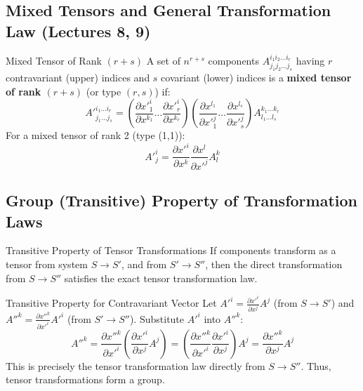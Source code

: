 \documentclass[11pt,a4paper]{article}
\begin{document}
\subsection{Mixed Tensors and General Transformation Law (Lectures 8, 9)}
\begin{definitionbox}{Mixed Tensor of Rank $(r+s)$}
A set of $n^{r+s}$ components $A^{i_1 i_2 \dots i_r}_{j_1 j_2 \dots j_s}$ having $r$ contravariant (upper) indices and $s$ covariant (lower) indices is a \textbf{mixed tensor of rank $(r+s)$} (or type $(r,s)$) if:
\[
A'^{i_1 \dots i_r}_{j_1 \dots j_s} = \left( \frac{\partial x'^i_1}{\partial x^{k_1}} \dots \frac{\partial x'^i_r}{\partial x^{k_r}} \right) \left( \frac{\partial x^{l_1}}{\partial x'^j_1} \dots \frac{\partial x^{l_s}}{\partial x'^j_s} \right) A^{k_1 \dots k_r}_{l_1 \dots l_s}
\]
For a mixed tensor of rank 2 (type (1,1)):
\[
A'^i_j = \frac{\partial x'^i}{\partial x^k} \frac{\partial x^l}{\partial x'^j} A^k_l
\]
\end{definitionbox}

\subsection{Group (Transitive) Property of Transformation Laws}
\begin{theorembox}{Transitive Property of Tensor Transformations}
If components transform as a tensor from system $S \to S'$, and from $S' \to S''$, then the direct transformation from $S \to S''$ satisfies the exact tensor transformation law.
\end{theorembox}
\begin{proofbox}{Transitive Property for Contravariant Vector}
Let $A'^i = \frac{\partial x'^i}{\partial x^j} A^j$ (from $S \to S'$) and $A''^k = \frac{\partial x''^k}{\partial x'^i} A'^i$ (from $S' \to S''$).
Substitute $A'^i$ into $A''^k$:
\[
A''^k = \frac{\partial x''^k}{\partial x'^i} \left( \frac{\partial x'^i}{\partial x^j} A^j \right) = \left( \frac{\partial x''^k}{\partial x'^i} \frac{\partial x'^i}{\partial x^j} \right) A^j = \frac{\partial x''^k}{\partial x^j} A^j
\]
This is precisely the tensor transformation law directly from $S \to S''$. Thus, tensor transformations form a group.
\end{proofbox}
\end{document}
